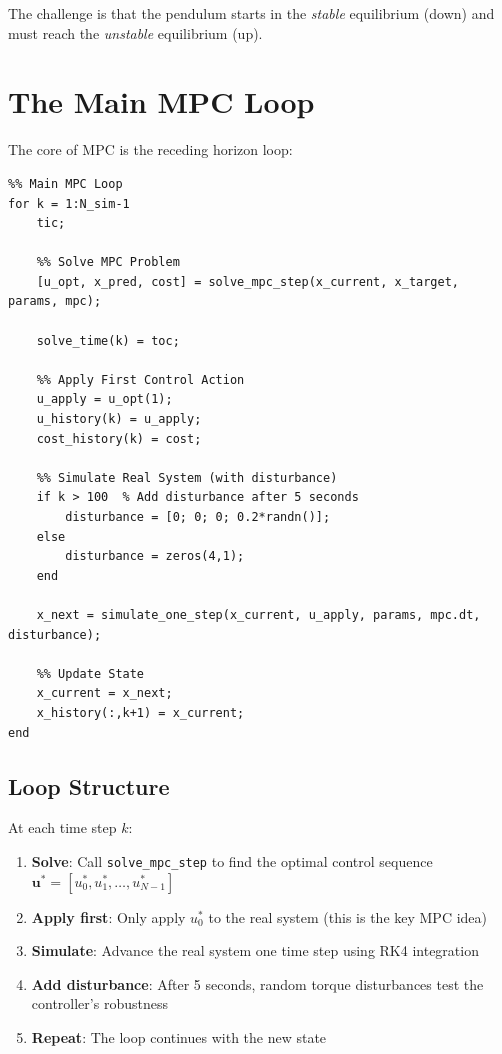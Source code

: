 \documentclass[11pt]{article}
\begin{document}
The challenge is that the pendulum starts in the \emph{stable} equilibrium (down) and must reach the \emph{unstable} equilibrium (up).

\section{The Main MPC Loop}

The core of MPC is the receding horizon loop:

\begin{lstlisting}
%% Main MPC Loop
for k = 1:N_sim-1
    tic;

    %% Solve MPC Problem
    [u_opt, x_pred, cost] = solve_mpc_step(x_current, x_target, params, mpc);

    solve_time(k) = toc;

    %% Apply First Control Action
    u_apply = u_opt(1);
    u_history(k) = u_apply;
    cost_history(k) = cost;

    %% Simulate Real System (with disturbance)
    if k > 100  % Add disturbance after 5 seconds
        disturbance = [0; 0; 0; 0.2*randn()];
    else
        disturbance = zeros(4,1);
    end

    x_next = simulate_one_step(x_current, u_apply, params, mpc.dt, disturbance);

    %% Update State
    x_current = x_next;
    x_history(:,k+1) = x_current;
end
\end{lstlisting}

\subsection{Loop Structure}

At each time step $k$:

\begin{enumerate}
    \item \textbf{Solve}: Call \texttt{solve\_mpc\_step} to find the optimal control sequence $\mathbf{u}^* = [u_0^*, u_1^*, \ldots, u_{N-1}^*]$

    \item \textbf{Apply first}: Only apply $u_0^*$ to the real system (this is the key MPC idea)

    \item \textbf{Simulate}: Advance the real system one time step using RK4 integration

    \item \textbf{Add disturbance}: After 5 seconds, random torque disturbances test the controller's robustness

    \item \textbf{Repeat}: The loop continues with the new state
\end{enumerate}
\end{document}
